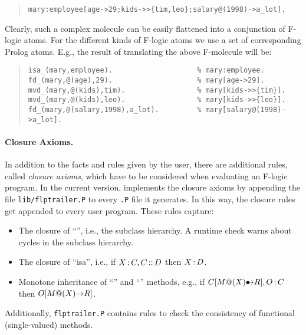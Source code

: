 \begin{quote}
{\small\begin{verbatim}
mary:employee[age->29;kids->>{tim,leo};salary@(1998)->a_lot].
\end{verbatim}}
\end{quote}

Clearly, such a complex molecule can be easily flattened into a conjunction
of F-logic atoms.  For the different kinds of F-logic atoms we use a set of
corresponding Prolog atoms. E.g., the result of translating the above
F-molecule will be:

\begin{quote}
{\small \begin{verbatim}
isa_(mary,employee).                    % mary:employee.
fd_(mary,@(age),29).                    % mary[age->29].
mvd_(mary,@(kids),tim).                 % mary[kids->>{tim}].
mvd_(mary,@(kids),leo).                 % mary[kids->>{leo}].
fd_(mary,@(salary,1998),a_lot).         % mary[salary@(1998)->a_lot].
\end{verbatim}}
\end{quote}



\paragraph{Closure Axioms.}

In addition to the facts and rules given by the user, there are additional
rules, called \emph{closure axioms}, which have to be considered when
evaluating an F-logic program. In the current version, \FLIP implements
the closure axioms by appending the file \texttt{lib/flptrailer.P} to every
{\tt .P} file it generates. In this way, the closure rules get appended to
every user program. These rules capture:

\begin{itemize}
\item The closure of ``\subcl'', i.e., the subclass hierarchy.  A
  runtime check warns about cycles in the subclass hierarchy.
\item The closure of ``isa'', i.e., if $X\,{\bf{:}}\, C, C\,{\bf{::}}\, D$ then
  $X\,{\bf{:}}\, D$. 
\item Monotone inheritance of ``\bfd'' and ``\bmvd'' methods,
  e.g., if $C[M@(X){\bullet\!\!\!{\rightarrow}} R],O\,{\bf{:}}\, C$ then $O[M@(X){\rightarrow} R]$.
\end{itemize}

Additionally, \texttt{flptrailer.P} contains rules to check the
consistency of functional (single-valued) methods.


